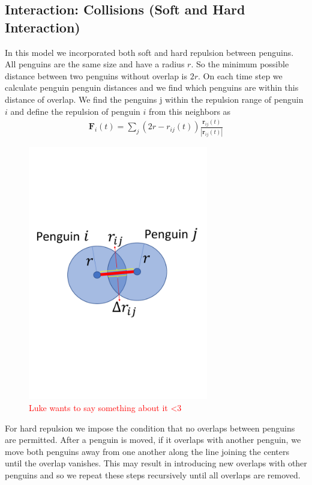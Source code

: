\documentclass[]{scrartcl}
\newcommand{\todo}[1]{\textcolor{red}{ #1}}
\newcommand{\tb}{\textbf}
\begin{document}
\subsection{Interaction: Collisions (Soft and Hard Interaction)}
In this model we incorporated both soft and hard repulsion between penguins. All penguins are the same size and have a radius $r$. So the minimum possible distance between two penguins without overlap is $2r$. On each time step we calculate penguin penguin distances and we find which penguins are within this distance of overlap. We find the penguins j within the repulsion range of penguin $i$ and define the repulsion of penguin $i$ from this neighbors as 
\begin{align}
\tb{F}_i (t)= \sum_j (2r - r_{ij}(t)) \frac{\tb{r}_{ij}(t)}{|\tb{r}_{ij}(t)|}
\end{align}
\begin{figure}[H]
\centering
\includegraphics[width = 0.7\textwidth]{figs/fig2.pdf}
\caption{\todo{Luke wants to say something about it <3}}
\end{figure}

For hard repulsion we impose the condition that no overlaps between penguins are permitted. After a penguin is moved, if it overlaps with another penguin, we move both penguins away from one another along the line joining the centers until the overlap vanishes. This may result in introducing new overlaps with other penguins and so we repeat these steps recursively until all overlaps are removed. 
\end{document}
